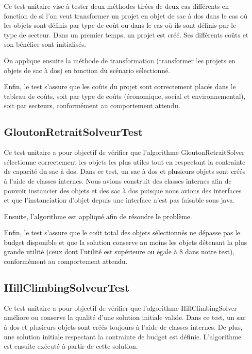 \documentclass[11pt]{article}
\begin{document}
Ce test unitaire vise à tester deux méthodes tirées de deux cas différents en fonction de si l’on veut transformer un projet en objet de sac à dos dans le cas où les objets sont définis par type de coût ou dans le cas où ils sont définis par le type de secteur. Dans un premier temps, un projet est créé. Ses différents coûts et son bénéfice sont initialisés. 

On applique ensuite la méthode de transformation (transformer les projets en objets de sac à dos) en fonction du scénario sélectionné. 

Enfin, le test s’assure que les coûts du projet sont correctement placés dans le tableau de coûts, soit par type de coûts (économique, social et environnemental), soit par secteurs, conformément au comportement attendu.

\subsection{GloutonRetraitSolveurTest}
Ce test unitaire a pour objectif de vérifier que l’algorithme GloutonRetraitSolver sélectionne correctement les objets les plus utiles tout en respectant la contrainte de capacité du sac à dos. Dans ce test, un sac à dos et plusieurs objets sont créés à l’aide de classes internes. Nous avions construit des classes internes afin de pouvoir instancier des objets et des sac à dos puisque nous avions des interfaces et que l’instanciation d’objet depuis une interface n’est pas faisable sous java. 

Ensuite, l’algorithme est appliqué afin de résoudre le problème. 

Enfin, le test s’assure que le coût total des objets sélectionnés ne dépasse pas le budget disponible et que la solution conserve au moins les objets détenant la plus grande utilité (ceux dont l’utilité est supérieure ou égale à 8 dans notre test), conformément au comportement attendu.

\subsection{HillClimbingSolveurTest}
Ce test unitaire a pour objectif de vérifier que l’algorithme HillClimbingSolver améliore ou conserve la qualité d’une solution initiale valide. Dans ce test, un sac à dos et plusieurs objets sont créés toujours à l’aide de classes internes. De plus, une solution initiale respectant la contrainte de budget est définie. L’algorithme est ensuite exécuté à partir de cette solution. 
\end{document}
